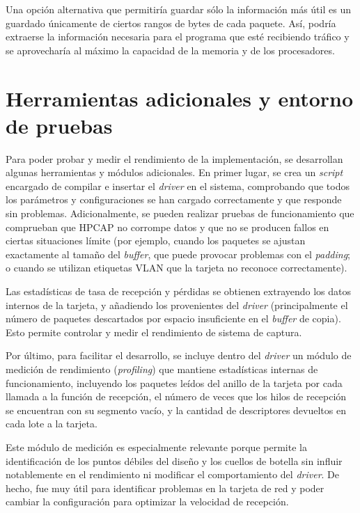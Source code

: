 \documentclass[twoside, 12pt]{epstfg}
\begin{document}
Una opción alternativa que permitiría guardar sólo la información más útil es un guardado únicamente de ciertos rangos de bytes de cada paquete. Así, podría extraerse la información necesaria para el programa que esté recibiendo tráfico y se aprovecharía al máximo la capacidad de la memoria y de los procesadores.

\section{Herramientas adicionales y entorno de pruebas}

Para poder probar y medir el rendimiento de la implementación, se desarrollan algunas herramientas y módulos adicionales. En primer lugar, se crea un \textit{script} encargado de compilar e insertar el \textit{driver} en el sistema, comprobando que todos los parámetros y configuraciones se han cargado correctamente y que responde sin problemas. Adicionalmente, se pueden realizar pruebas de funcionamiento que comprueban que HPCAP no corrompe datos y que no se producen fallos en ciertas situaciones límite (por ejemplo, cuando los paquetes se ajustan exactamente al tamaño del \textit{buffer}, que puede provocar problemas con el \textit{padding}; o cuando se utilizan etiquetas VLAN que la tarjeta no reconoce correctamente).

Las estadísticas de tasa de recepción y pérdidas se obtienen extrayendo los datos internos de la tarjeta, y añadiendo los provenientes del \textit{driver} (principalmente el número de paquetes descartados por espacio insuficiente en el \textit{buffer} de copia). Esto permite controlar y medir el rendimiento de sistema de captura.

Por último, para facilitar el desarrollo, se incluye dentro del \textit{driver} un módulo de medición de rendimiento (\textit{profiling}) que mantiene estadísticas internas de funcionamiento, incluyendo los paquetes leídos del anillo de la tarjeta por cada llamada a la función de recepción, el número de veces que los hilos de recepción se encuentran con su segmento vacío, y la cantidad de descriptores devueltos en cada lote a la tarjeta.

Este módulo de medición es especialmente relevante porque permite la identificación de los puntos débiles del diseño y los cuellos de botella sin influir notablemente en el rendimiento ni modificar el comportamiento del \textit{driver}. De hecho, fue muy útil para identificar problemas en la tarjeta de red y poder cambiar la configuración para optimizar la velocidad de recepción.
\end{document}
